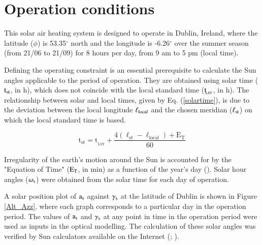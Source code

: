 \section{Operation conditions}

This solar air heating system is designed to operate in Dublin, Ireland, where the latitude ($\phi$) is 53.35$^{\circ}$ north and the longitude is -6.26$^{\circ}$ over the summer season (from 21/06 to 21/09) for 8 hours per day, from 9 am to 5 pm (local time).

Defining the operating constraint is an essential prerequisite to calculate the Sun angles applicable to the period of operation. They are obtained using solar time ($\rm{t_{st}}$, in h), which does not coincide with the local standard time (${\rm t_{\!_{LST}}}$, in h). The relationship between solar and local times, given by Eq. (\ref{solartime}), is due to the deviation between the local longitude ${\rm \ell_{local}}$ and the chosen meridian (${\rm \ell_{st}}$) on which the local standard time is based.

\begin{equation}
    \mathrm{t_{st} = t_{\!_{LST}} + \frac{4(\ell_{st} - \ell_{local}) + E_T}{60}}
    \label{solartime}
\end{equation}

Irregularity of the earth's motion around the Sun is accounted for by the "Equation of Time" ($\rm{E_T}$, in min) as a function of the year's day (\cite{Goswami2015}). Solar hour angles ($\omega_{\rm{s}}$) were obtained from the solar time for each day of operation. 

%
%

A solar position plot of ${\rm a_s}$ against $\gamma_{\rm{s}}$ at the latitude of Dublin is shown in Figure \ref{Alt_Azz}, where each graph corresponds to a particular day in the operation period. The values of ${\rm a_s}$ and $\gamma_{\rm{s}}$ at any point in time in the operation period were used as inputs in the optical modelling. The calculation of these solar angles was verified by Sun calculators available on the Internet (\cite{Time2018}; \cite{SunCalc2018}).

